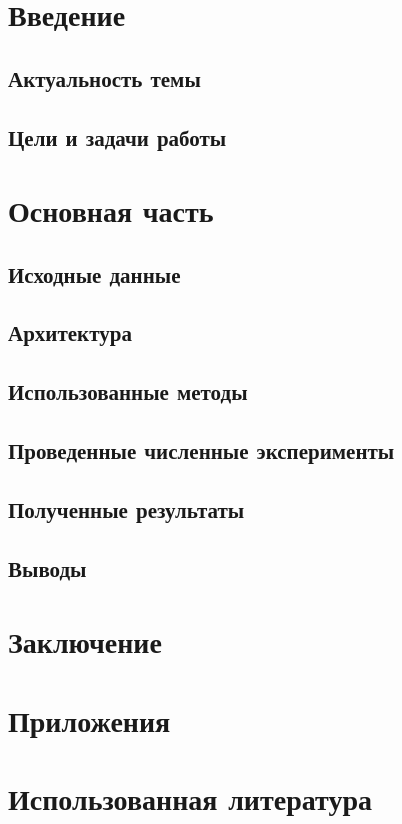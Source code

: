 \documentclass[main.tex]{subfiles}
\begin{document}
	\section{Введение}
	\subsection{Актуальность темы}
	
	\subsection{Цели и задачи работы}
	
	\section{Основная часть}
	\subsection{Исходные данные}
	
	\subsection{Архитектура}
	
	\subsection{Использованные методы}
	
	\subsection{Проведенные численные эксперименты}
	
	\subsection{Полученные результаты}
	
	\subsection{Выводы}
	\section{Заключение}
	
	\section{Приложения}
	\section{Использованная литература}
	\printbibliography
\end{document}
